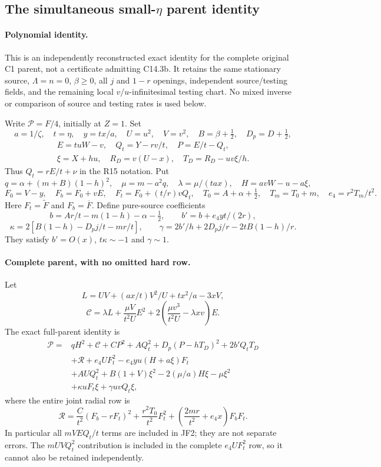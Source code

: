 \subsection{The simultaneous small-$\eta$ parent identity}

\label{component:pa73a17051258}

\paragraph{Polynomial identity.}
This is an independently reconstructed exact identity for the complete
original C1 parent, not a certificate admitting C14.3b. It retains the
same stationary source, $\Lambda=n=0$, $\beta\ge0$, all $j$ and $1-r$
openings, independent source/testing fields, and the remaining local
$v/u$-infinitesimal testing chart. No mixed inverse or comparison of
source and testing rates is used below.

Write $\mathcal P=F/4$, initially at $Z=1$. Set
\[
 a=1/\zeta,\quad t=\eta,\quad y=tx/a,\quad U=u^2,\quad V=v^2,
 \quad B=\beta+\tfrac12,\quad D_p=D+\tfrac12,
\]
\[
 \begin{gathered}
 E=tuW-v,\quad Q_t=Y-rv/t,\quad P=E/t-Q_t,\\
 \xi=X+hu,\quad R_D=v(U-x),\quad T_D=R_D-uv\xi/h.
 \end{gathered}
\]
Thus $Q_t=rE/t+\nu$ in the R15 notation. Put
\[
 q=\alpha+(m+B)(1-h)^2,\quad\mu=m-a^2q,
 \quad\lambda=\mu/(tax),\quad H=avW-u-a\xi,
\]
\[
 F_0=V-y,\quad F_b=F_0+vE,\quad F_t=F_0+(t/r)vQ_t,
 \quad T_0=A+\alpha+\tfrac12,\quad T_m=T_0+m,
 \quad e_4=r^2T_m/t^2.
\]
Here $F_t=\widetilde F$ and $F_b=\overline F$. Define pure-source
coefficients
\[
 b=Ar/t-m(1-h)-\alpha-\tfrac12,\qquad
 b'=b+e_4yt/(2r),
\]
\[
 \kappa=2[B(1-h)-D_pj/t-mr/t],\qquad
 \gamma=2b'/h+2D_pj/r-2tB(1-h)/r.
\]
They satisfy $b'=O(x)$, $t\kappa\sim-1$ and $\gamma\sim1$.

\paragraph{Complete parent, with no omitted hard row.}
Let
\[
 L=UV+(ax/t)V^2/U+tx^2/a-3xV,
\]
\[
 \mathscr C=\lambda L+\frac{\mu V}{t^2U}E^2
                +2\left(\frac{\mu v^3}{t^2U}-\lambda xv\right)E.
\]
The exact full-parent identity is
\begin{align*}
 \mathcal P={}&qH^2+\mathscr C
 +CP^2+AQ_t^2+D_p(P-hT_D)^2+2b'Q_tT_D\\
 &+\mathscr R+e_4UF_t^2-e_4yu(H+a\xi)F_t\\
 &+AUQ_t^2+B(1+V)\xi^2
                 -2(\mu/a)H\xi-\mu\xi^2\\
 &+\kappa uF_t\xi+\gamma uvQ_t\xi,                 \tag{JF1}
\end{align*}
where the entire joint radial row is
\[
 \mathscr R=\frac C{t^2}(F_b-rF_t)^2
       +\frac{r^2T_0}{t^2}F_t^2
       +\left(\frac{2mr}{t^2}+e_4x\right)F_bF_t.    \tag{JF2}
\]
In particular all $mVEQ_t/t$ terms are included in JF2; they are not
separate errors. The $mUVQ_t^2$ contribution is included in the complete
$e_4UF_t^2$ row, so it cannot also be retained independently.

